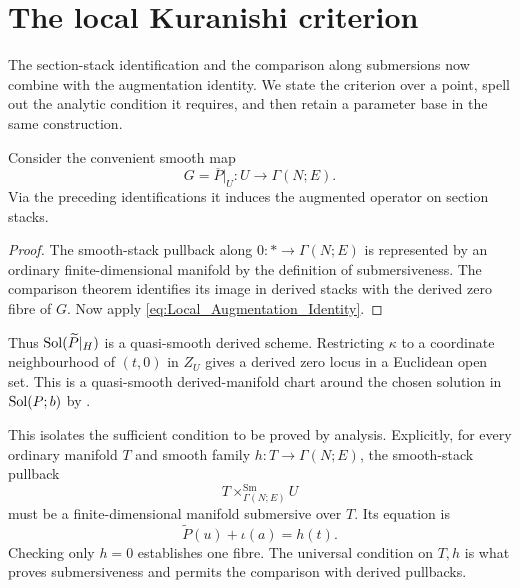\section{The local Kuranishi criterion}

The section-stack identification and the comparison along submersions
now combine with the augmentation identity. We state the criterion
over a point, spell out the analytic condition it requires, and then
retain a parameter base in the same construction.

Consider the convenient smooth map
\[
 G=\overline P|_U\colon U\longrightarrow\Gamma(N;E).
\]
Via the preceding identifications it induces the augmented operator
on section stacks.


\begin{proof}
The smooth-stack pullback along $0\colon *\to\Gamma(N;E)$ is represented
by an ordinary finite-dimensional manifold by the definition of
submersiveness. The comparison theorem identifies its image in
derived stacks with the derived zero fibre of $G$.
Now apply \eqref{eq:Local_Augmentation_Identity}.
\end{proof}

Thus $\operatorname{Sol}(\widetilde P|_H)$ is a quasi-smooth derived scheme.
Restricting $\kappa$ to a coordinate neighbourhood of $(t,0)$ in
$Z_U$ gives a derived zero locus in a Euclidean open set. This is a
quasi-smooth derived-manifold chart around the chosen solution in
$\operatorname{Sol}(P;b)$ by .

This isolates the sufficient condition to be proved by analysis.
Explicitly, for every ordinary manifold $T$ and smooth family
$h\colon T\to\Gamma(N;E)$, the smooth-stack pullback
\[
 T\times_{\Gamma(N;E)}^{\mathrm{Sm}}U
\]
must be a finite-dimensional manifold submersive over $T$.
Its equation is
\[
 \widetilde P(u)+\iota(a)=h(t).
\]
Checking only $h=0$ establishes one fibre. The universal condition
on $T,h$ is what proves submersiveness and permits the comparison
with derived pullbacks.

